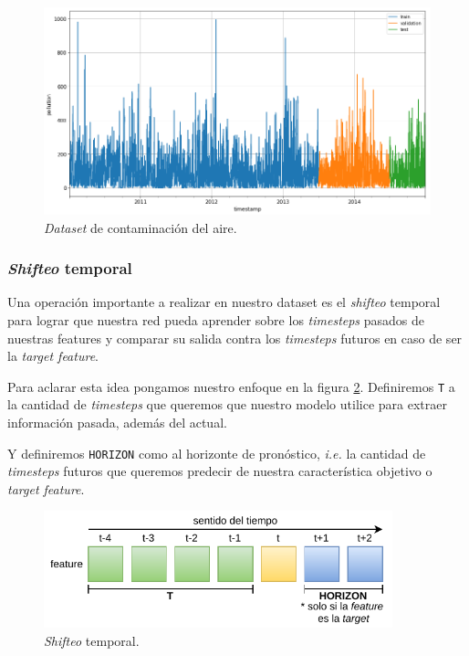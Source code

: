 \documentclass[a4paper,12pt]{article}
\begin{document}
\begin{figure}[H]
	\begin{center}
	\includegraphics[width=1\textwidth]{tvt_pollution.png}
  	\caption{\textit{Dataset} de contaminación del aire.}
  	\label{fig:tvt_pollution}
  	\end{center}
\end{figure}

\subsubsection{\textit{Shifteo} temporal}
Una operación importante a realizar en nuestro dataset es el \textit{shifteo} temporal para lograr que nuestra red pueda aprender sobre los \textit{timesteps} pasados de nuestras features y comparar su salida contra los \textit{timesteps} futuros en caso de ser la \textit{target feature}.

Para aclarar esta idea pongamos nuestro enfoque en la figura \ref{fig:shift_explain}. Definiremos \texttt{T} a la cantidad de \textit{timesteps} que queremos que nuestro modelo utilice para extraer información pasada, además del actual.

Y definiremos \texttt{HORIZON} como al horizonte de pronóstico, \textit{i.e.} la cantidad de \textit{timesteps} futuros que queremos predecir de nuestra característica objetivo o \textit{target feature}.

\begin{figure}[H]
	\begin{center}
	\includegraphics[width=0.9\textwidth]{time-shift.pdf}
  	\caption{\textit{Shifteo} temporal.}
  	\label{fig:shift_explain}
  	\end{center}
\end{figure}
\end{document}
